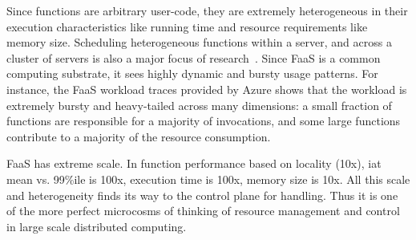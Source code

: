 Since functions are arbitrary user-code, they are extremely heterogeneous in their execution characteristics like running time and resource requirements like memory size. 
Scheduling heterogeneous functions within a server, and across a cluster of servers is also a major focus of  research~\cite{}.
Since FaaS is a common computing substrate, it sees highly dynamic and bursty usage patterns.
For instance, the FaaS workload traces provided by Azure shows that the workload is extremely bursty and heavy-tailed across many dimensions: a small fraction of functions are responsible for a majority of invocations, and some large functions contribute to a majority of the resource consumption.

FaaS has extreme scale.
In function performance based on locality (10x), iat mean vs. 99\%ile is 100x, execution time is 100x, memory size is 10x.
All this scale and heterogeneity finds its way to the control plane for handling.
Thus it is one of the more perfect microcosms of thinking of resource management and control in large scale distributed computing. 

